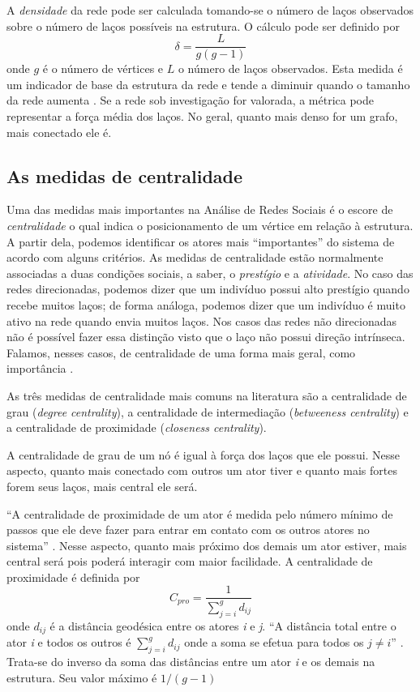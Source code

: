 \documentclass[a4paper, 12pt, openright, oneside, german, french, english, brazil]{abntex2}
\begin{document}
	A \textit{densidade} da rede pode ser calculada tomando-se o número de laços observados sobre o número de laços possíveis na estrutura. O cálculo pode ser definido por $$\delta = \frac{L}{g(g-1)}$$ onde $g$ é o número de vértices e $L$ o número de laços observados. Esta medida é um indicador de base da estrutura da rede e tende a diminuir quando o tamanho da rede aumenta \cite{lazega2014redes}. Se a rede sob investigação for valorada, a métrica pode representar a força média dos laços. No geral, quanto mais denso for um grafo, mais conectado ele é.
	
	\subsection{As medidas de centralidade}
	
	Uma das medidas mais importantes na Análise de Redes Sociais é o escore de \textit{centralidade} o qual indica o posicionamento de um vértice em relação à estrutura. A partir dela, podemos identificar os atores mais ``importantes'' do sistema de acordo com alguns critérios. As medidas de centralidade estão normalmente associadas a duas condições sociais, a saber, o \textit{prestígio} e a \textit{atividade}. No caso das redes direcionadas, podemos dizer que um indivíduo possui alto prestígio quando recebe muitos laços; de forma análoga, podemos dizer que um indivíduo é muito ativo na rede quando envia muitos laços. Nos casos das redes não direcionadas não é possível fazer essa distinção visto que o laço não possui direção intrínseca. Falamos, nesses casos, de centralidade de uma forma mais geral, como importância \cite{lazega2014redes}.
	
	As três medidas de centralidade mais comuns na literatura são a centralidade de grau (\textit{degree centrality}), a centralidade de intermediação (\textit{betweeness centrality}) e a centralidade de proximidade (\textit{closeness centrality}).
	
	A centralidade de grau de um nó é igual à força dos laços que ele possui. Nesse aspecto, quanto mais conectado com outros um ator tiver e quanto mais fortes forem seus laços, mais central ele será. 
	
	``A centralidade de proximidade de um ator é medida pelo número mínimo de passos que ele deve fazer para entrar em contato com os outros atores no sistema'' \cite[p. 43]{lazega2014redes}. Nesse aspecto, quanto mais próximo dos demais um ator estiver, mais central será pois poderá interagir com maior facilidade. A centralidade de proximidade é definida por $$C_{pro} = \frac{1}{\sum_{j=i}^{g} d_{ij}}$$ onde $d_{ij}$ é a distância geodésica entre os atores \textit{i} e \textit{j}. ``A distância total entre o ator \textit{i} e todos os outros é $\sum_{j=i}^{g} d_{ij}$ onde a soma se efetua para todos os $j \neq i$'' \cite[p. 44]{lazega2014redes}. Trata-se do inverso da soma das distâncias entre um ator \textit{i} e os demais na estrutura. Seu valor máximo é $1/(g-1)$
	
\end{document}
